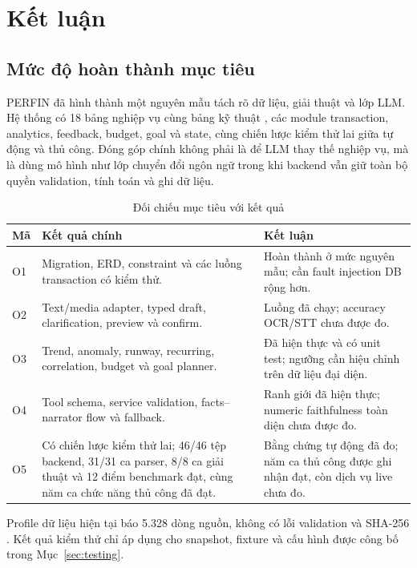 \chapter{Kết luận}
\label{chap:conclusion}

\section{Mức độ hoàn thành mục tiêu}

PERFIN đã hình thành một nguyên mẫu tách rõ dữ liệu, giải thuật và lớp LLM. Hệ thống có 18 bảng nghiệp vụ cùng bảng kỹ thuật , các module transaction, analytics, feedback, budget, goal và state, cùng chiến lược kiểm thử lai giữa tự động và thủ công. Đóng góp chính không phải là để LLM thay thế nghiệp vụ, mà là dùng mô hình như lớp chuyển đổi ngôn ngữ trong khi backend vẫn giữ toàn bộ quyền validation, tính toán và ghi dữ liệu.

\begin{table}[H]
  \centering
  \caption{Đối chiếu mục tiêu với kết quả}
  \label{tab:objective-evidence}
  \begin{tabularx}{\textwidth}{@{}L{1.0cm}Y Y@{}}
    \toprule
    \textbf{Mã} & \textbf{Kết quả chính} & \textbf{Kết luận} \\
    \midrule
    O1 & Migration, ERD, constraint và các luồng transaction có kiểm thử. & Hoàn thành ở mức nguyên mẫu; cần fault injection DB rộng hơn. \\
    O2 & Text/media adapter, typed draft, clarification, preview và confirm. & Luồng đã chạy; accuracy OCR/STT chưa được đo. \\
    O3 & Trend, anomaly, runway, recurring, correlation, budget và goal planner. & Đã hiện thực và có unit test; ngưỡng cần hiệu chỉnh trên dữ liệu đại diện. \\
    O4 & Tool schema, service validation, facts--narrator flow và fallback. & Ranh giới đã hiện thực; numeric faithfulness toàn diện chưa được đo. \\
    O5 & Có chiến lược kiểm thử lai; 46/46 tệp backend, 31/31 ca parser, 8/8 ca giải thuật và 12 điểm benchmark đạt, cùng năm ca chức năng thủ công đã đạt. & Bằng chứng tự động đã đo; năm ca thủ công được ghi nhận đạt, còn dịch vụ live chưa đo. \\
    \bottomrule
  \end{tabularx}
\end{table}

Profile dữ liệu hiện tại báo 5.328 dòng nguồn, không có lỗi validation và SHA-256 . Kết quả kiểm thử chỉ áp dụng cho snapshot, fixture và cấu hình được công bố trong Mục~\ref{sec:testing}.

